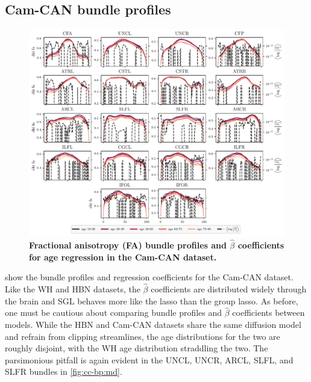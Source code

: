 \documentclass[10pt,%
               aps,%
               prl,%
               preprint,%
               superscriptaddress,%
               preprintnumbers,%
               amsmath,%
               floatfix,%
               endfloats*]{revtex4-2}
\begin{document}
\subsection{Cam-CAN bundle profiles}

\begin{figure}
    \includegraphics[width=\textwidth]{cc_coefs_profiles_fa.pdf}
    \caption{%
        {%
            \bf Fractional anisotropy (FA) bundle profiles and $\hat{\beta}$
            coefficients for age regression in the Cam-CAN dataset.
        }
        \label{fig:cc-bp:fa}
    }
\end{figure}

 show the bundle profiles and regression
coefficients for the Cam-CAN dataset. Like the WH and HBN datasets, the
$\hat{\beta}$ coefficients are distributed widely through the brain and SGL
behaves more like the lasso than the group lasso. As before, one must be
cautious about comparing bundle profiles and $\hat{\beta}$ coefficients
between models. While the HBN and Cam-CAN datasets share the same diffusion
model and refrain from clipping streamlines, the age distributions for the
two are roughly disjoint, with the WH age distribution straddling the two.
The parsimonious pitfall is again evident in the UNCL, UNCR, ARCL, SLFL, and
SLFR bundles in \cref{fig:cc-bp:md}.
\end{document}
